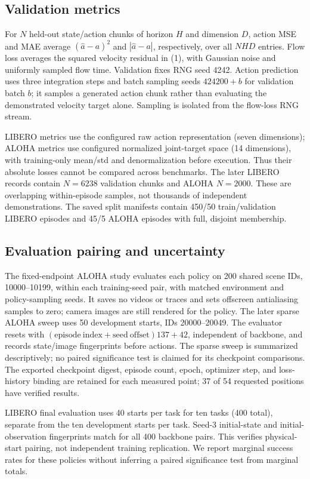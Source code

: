 \documentclass[conference]{IEEEtran}
\begin{document}
\subsection{Validation metrics}
For $N$ held-out state/action chunks of horizon $H$ and dimension $D$, action
MSE and MAE average $(\hat a-a)^2$ and $|\hat a-a|$, respectively, over all
$NHD$ entries. Flow loss averages the squared velocity residual in (1), with
Gaussian noise and uniformly sampled flow time. Validation fixes RNG seed 4242.
Action prediction uses three integration steps and batch sampling seeds
$424200+b$ for validation batch $b$; it samples a generated action chunk rather
than evaluating the demonstrated velocity target alone. Sampling is isolated
from the flow-loss RNG stream.

LIBERO metrics use the configured raw action representation (seven dimensions);
ALOHA metrics use configured normalized joint-target space (14 dimensions),
with training-only mean/std and denormalization before execution. Thus their
absolute losses cannot be compared across benchmarks. The later LIBERO records
contain $N=6238$ validation chunks and ALOHA $N=2000$. These are overlapping
within-episode samples, not thousands of independent demonstrations. The saved
split manifests contain 450/50 train/validation LIBERO episodes and 45/5 ALOHA
episodes with full, disjoint membership.

\subsection{Evaluation pairing and uncertainty}
The fixed-endpoint ALOHA study evaluates each policy on 200 shared scene IDs,
10000--10199, within each training-seed pair, with matched environment and
policy-sampling seeds. It saves no videos or traces and sets offscreen
antialiasing samples to zero; camera images are still rendered for the policy.
The later sparse ALOHA sweep uses 50 development starts, IDs 20000--20049.
The evaluator resets with $(\mathrm{episode\ index}+\mathrm{seed\ offset})137+42$,
independent of backbone, and records state/image fingerprints before actions.
The sparse sweep is summarized descriptively; no paired significance test is
claimed for its checkpoint comparisons. The exported checkpoint digest,
episode count, epoch, optimizer step, and loss-history binding are retained
for each measured point; 37 of 54 requested positions have verified results.

LIBERO final evaluation uses 40 starts per task for ten tasks (400 total),
separate from the ten development starts per task. Seed-3 initial-state and
initial-observation fingerprints match for all 400 backbone pairs. This verifies
physical-start pairing, not independent training replication. We report marginal
success rates for these policies without inferring a paired significance test
from marginal totals.
\end{document}
